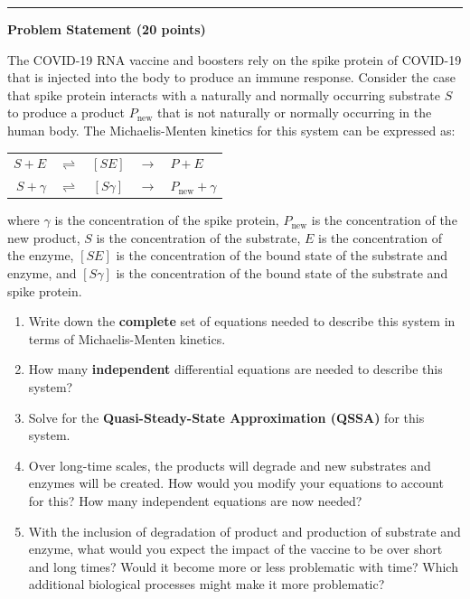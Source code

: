 \documentclass[12pt]{article}
\begin{document}
\vspace{1.5em}
\hrule
\vspace{1.5em}
\newpage


\begin{mdframed}[style=problembox]
\textbf{\color{problemblue}\large Problem Statement (20 points)}

\medskip
The COVID-19 RNA vaccine and boosters rely on the spike protein of COVID-19 that is injected
into the body to produce an immune response. Consider the case that spike protein interacts
with a naturally and normally occurring substrate $S$ to produce a product $P_{\text{new}}$
that is not naturally or normally occurring in the human body.
The Michaelis-Menten kinetics for this system can be expressed as:

\medskip
\begin{center}
\renewcommand{\arraystretch}{1.4}
\begin{tabular}{rcccl}
$S + E$        & $\rightleftharpoons$ & $[SE]$      & $\rightarrow$ & $P + E$ \\
$S + \gamma$   & $\rightleftharpoons$ & $[S\gamma]$ & $\rightarrow$ & $P_{\text{new}} + \gamma$
\end{tabular}
\end{center}

\medskip
\noindent where $\gamma$ is the concentration of the spike protein, $P_{\text{new}}$ is the
concentration of the new product, $S$ is the concentration of the substrate, $E$ is the
concentration of the enzyme, $[SE]$ is the concentration of the bound state of the substrate
and enzyme, and $[S\gamma]$ is the concentration of the bound state of the substrate and
spike protein.

\medskip
\begin{enumerate}[label=\textbf{(\alph*)}]
  \item Write down the \textbf{complete} set of equations needed to describe this system in
        terms of Michaelis-Menten kinetics.
  \item How many \textbf{independent} differential equations are needed to describe this
        system?
  \item Solve for the \textbf{Quasi-Steady-State Approximation (QSSA)} for this system.
  \item Over long-time scales, the products will degrade and new substrates and enzymes will
        be created. How would you modify your equations to account for this? How many
        independent equations are now needed?
  \item With the inclusion of degradation of product and production of substrate and enzyme,
        what would you expect the impact of the vaccine to be over short and long times?
        Would it become more or less problematic with time? Which additional biological
        processes might make it more problematic?
\end{enumerate}
\end{mdframed}
\end{document}
